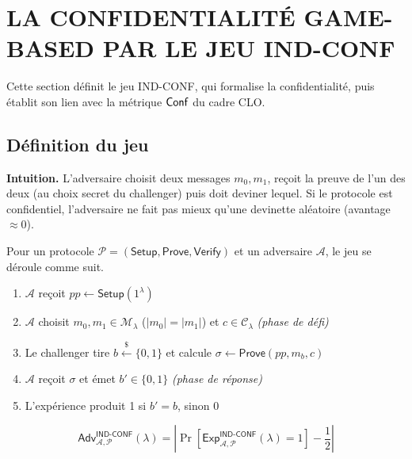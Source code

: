 \section{LA CONFIDENTIALIT\'E GAME-BASED PAR LE JEU IND-CONF}
\label{sec:gamebased_confidentialite}
\begin{sloppypar}

Cette section d\'efinit le jeu IND-CONF, qui formalise la confidentialit\'e, puis
\'etablit son lien avec la m\'etrique $\mathsf{Conf}$ du cadre CLO.

\subsection{D\'efinition du jeu}

\noindent\textbf{Intuition.} L'adversaire choisit deux messages
$m_0, m_1$, re\c{c}oit la preuve de l'un des deux (au choix secret du
challenger) puis doit deviner lequel. Si le protocole est confidentiel,
l'adversaire ne fait pas mieux qu'une devinette al\'eatoire
(avantage $\approx 0$).

\begin{definition}\label{def:ann_ind_conf}
Pour un protocole $\mathcal{P} = (\mathsf{Setup},\mathsf{Prove},
\mathsf{Verify})$ et un adversaire $\mathcal{A}$, le jeu se d\'eroule comme suit.
\begin{enumerate}
\item $\mathcal{A}$ reçoit $pp \leftarrow \mathsf{Setup}(1^\lambda)$
\item $\mathcal{A}$ choisit $m_0,m_1 \in \mathcal{M}_\lambda$
      ($|m_0|=|m_1|$) et $c \in \mathcal{C}_\lambda$
      \hfill\textit{(phase de défi)}
\item Le challenger tire $b \xleftarrow{\$} \{0,1\}$ et calcule
      $\sigma \leftarrow \mathsf{Prove}(pp, m_b, c)$
\item $\mathcal{A}$ reçoit $\sigma$ et émet $b' \in \{0,1\}$
      \hfill\textit{(phase de réponse)}
\item L'expérience produit 1 si $b' = b$, sinon 0
\end{enumerate}
\begin{equation}
\mathsf{Adv}^{\mathsf{IND\text{-}CONF}}_{\mathcal{A},\mathcal{P}}(\lambda)
= \left|\Pr\!\left[
\mathsf{Exp}^{\mathsf{IND\text{-}CONF}}_{\mathcal{A},\mathcal{P}}(\lambda)
= 1\right] - \frac{1}{2}\right|
\end{equation}
\end{definition}


\end{sloppypar}
